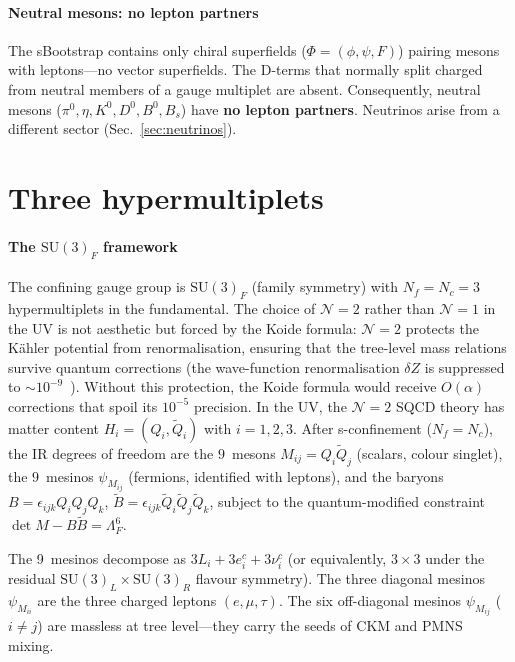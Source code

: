 \documentclass[aps,prd,twocolumn,showpacs,preprintnumbers,superscriptaddress]{revtex4-2}
\newcommand{\SU}{\mathrm{SU}}
\newcommand{\Nc}{N_c}
\newcommand{\Nf}{N_f}
\begin{document}
\paragraph{Neutral mesons: no lepton partners}

The sBootstrap contains only chiral superfields
($\Phi = (\phi, \psi, F)$) pairing mesons with leptons---no
vector superfields.
The D-terms that normally split charged from neutral
members of a gauge multiplet are absent.
Consequently, neutral mesons
($\pi^0, \eta, K^0, D^0, B^0, B_s$) have
\textbf{no lepton partners}.
Neutrinos arise from a different sector
(Sec.~\ref{sec:neutrinos}).

\section{Three hypermultiplets}
\label{sec:hyper}

\paragraph{The $\SU(3)_F$ framework}

The confining gauge group is $\SU(3)_F$ (family symmetry) with
$\Nf = \Nc = 3$ hypermultiplets in the fundamental.
The choice of $\mathcal{N}{=}2$ rather than $\mathcal{N}{=}1$
in the UV is not aesthetic but forced by the Koide formula:
$\mathcal{N}{=}2$ protects the K\"ahler potential from
renormalisation, ensuring that the tree-level mass
relations survive quantum corrections (the wave-function
renormalisation $\delta Z$ is suppressed to
$\sim 10^{-9}$~\cite{v159}).
Without this protection, the Koide formula would receive
$O(\alpha)$ corrections that spoil its $10^{-5}$ precision.
In the UV, the $\mathcal{N}{=}2$ SQCD theory has matter
content $H_i = (Q_i, \tilde Q_i)$ with $i = 1,2,3$.
After s-confinement ($\Nf = \Nc$), the IR degrees of freedom
are the $9$~mesons $M_{ij} = Q_i \tilde Q_j$ (scalars, colour
singlet), the $9$~mesinos $\psi_{M_{ij}}$ (fermions, identified
with leptons), and the baryons
$B = \epsilon_{ijk} Q_i Q_j Q_k$,
$\tilde B = \epsilon_{ijk} \tilde Q_i \tilde Q_j \tilde Q_k$,
subject to the quantum-modified constraint
$\det M - B\tilde B = \Lambda_F^6$.

The 9~mesinos decompose as
$3L_i + 3e^c_i + 3\nu^c_i$ (or equivalently,
$3 \times 3$ under the residual $\SU(3)_L \times \SU(3)_R$
flavour symmetry).
The three diagonal mesinos $\psi_{M_{ii}}$ are the
three charged leptons $(e, \mu, \tau)$.
The six off-diagonal mesinos $\psi_{M_{ij}}$
($i \neq j$) are massless at tree level---they carry the
seeds of CKM and PMNS mixing.
\end{document}

